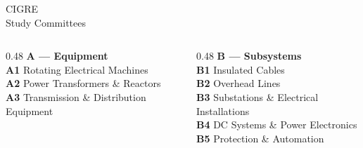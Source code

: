 \begin{frame}{CIGRE\\Study Committees}
  \vspace{0.6em}
  \begin{columns}[T,onlytextwidth]
    \begin{column}{0.48\textwidth}
      {\color{atAccent}\textbf{A — Equipment}}\\[0.35em]
      \footnotesize
      \textbf{A1} Rotating Electrical Machines\\[0.25em]
      \textbf{A2} Power Transformers \& Reactors\\[0.25em]
      \textbf{A3} Transmission \& Distribution Equipment
    \end{column}
    \begin{column}{0.48\textwidth}
      {\color{atAccent}\textbf{B — Subsystems}}\\[0.35em]
      \footnotesize
      \textbf{B1} Insulated Cables\\[0.25em]
      \textbf{B2} Overhead Lines\\[0.25em]
      \textbf{B3} Substations \& Electrical Installations\\[0.25em]
      {\color{atInk}\textbf{B4} DC Systems \& Power Electronics}\\[0.25em]
      \textbf{B5} Protection \& Automation
    \end{column}
  \end{columns}
  \vspace{0.8em}
\end{frame}


